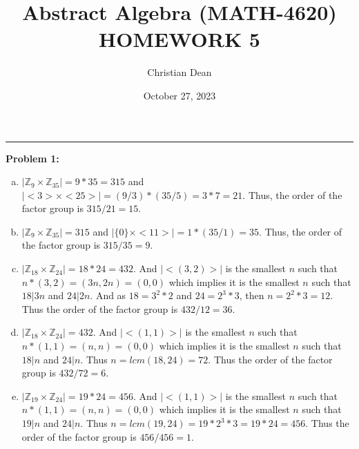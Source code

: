 \documentclass[12pt, letterpaper]{article}
\title{Abstract Algebra (MATH-4620) HOMEWORK 5}
\author{Christian Dean}
\date{October 27, 2023}
\newenvironment{problem}
    [1]
    {\noindent \textbf{Problem #1:}}
    {\vspace{3mm}}
\begin{document}
\maketitle

\noindent\hfil\rule{16cm}{0.4pt}\hfil

\begin{problem}{1}
    \begin{enumerate}[(a)]
        \item $|\mathbb{Z}_9 \times \mathbb{Z}_{35}| = 9 * 35 = 315$ and $|{<}3{>} \times 
        {<}25{>}| = (9/3) * (35/5) = 3 * 7 = 21$. Thus, the order of the factor group is
        $315/21 = 15$.

        \item $|\mathbb{Z}_9 \times \mathbb{Z}_{35}| = 315$ and $|\{0\} \times 
        {<}11{>}| = 1 * (35/1) = 35$. Thus, the order of the factor group is $315/35 = 
        9$.

        \item $|\mathbb{Z}_{18} \times \mathbb{Z}_{24}| = 18 * 24 = 432$. And $|{<}(3,2){>}|$
        is the smallest $n$ such that $n * (3,2) = (3n, 2n) = (0, 0)$ which implies
        it is the smallest $n$ such that $18|3n$ and $24|2n$. And as $18 = 3^2 * 2$ and
        $24 = 2^3 * 3$, then $n = 2^2 * 3 = 12$. Thus the order of the factor group is
        $432 / 12 = 36$.

        \item $|\mathbb{Z}_{18} \times \mathbb{Z}_{24}| = 432$. And $|{<}(1,1){>}|$
        is the smallest $n$ such that $n * (1,1) = (n, n) = (0, 0)$ which implies
        it is the smallest $n$ such that $18|n$ and $24|n$. Thus $n = lcm(18, 24) = 72$. 
        Thus the order of the factor group is $432 / 72 = 6$.

        \item $|\mathbb{Z}_{19} \times \mathbb{Z}_{24}| = 19 * 24 = 456$. And 
        $|{<}(1,1){>}|$ is the smallest $n$ such that $n * (1,1) = (n, n) = (0, 0)$ 
        which implies it is the smallest $n$ such that $19|n$ and $24|n$. Thus 
        $n = lcm(19, 24) = 19 * 2^3 * 3 = 19 * 24 = 456$. Thus the order of the factor 
        group is $456 / 456  = 1$.
    \end{enumerate}
\end{problem}
\end{document}
